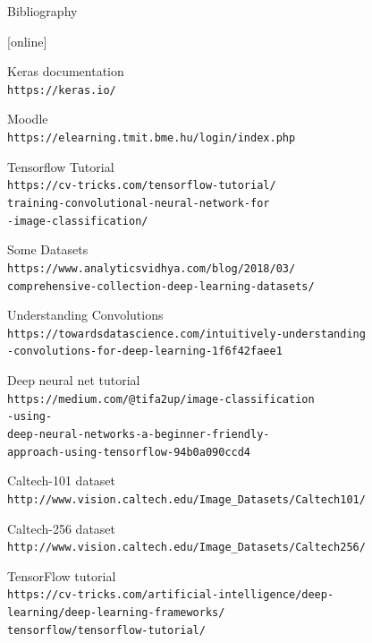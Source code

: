\documentclass{beamer}
\begin{document}
\begin{frame}[allowframebreaks]{Bibliography}
\footnotesize

  \begin{thebibliography}{8}
  [online]

   Keras documentation
   \\\texttt{https://keras.io/}

   Moodle
   \\\texttt{https://elearning.tmit.bme.hu/login/index.php}

   Tensorflow Tutorial
   \\\texttt{https://cv-tricks.com/tensorflow-tutorial/\\training-convolutional-neural-network-for\\-image-classification/}

   Some Datasets
   \\\texttt{https://www.analyticsvidhya.com/blog/2018/03/\\comprehensive-collection-deep-learning-datasets/}


   Understanding Convolutions
   \\\texttt{https://towardsdatascience.com/intuitively-understanding\\-convolutions-for-deep-learning-1f6f42faee1}

   Deep neural net tutorial
   \\\texttt{https://medium.com/@tifa2up/image-classification\\-using-\\deep-neural-networks-a-beginner-friendly-\\approach-using-tensorflow-94b0a090ccd4}

   Caltech-101 dataset
   \\\texttt{http://www.vision.caltech.edu/Image\_Datasets/Caltech101/}


   Caltech-256 dataset
   \\\texttt{http://www.vision.caltech.edu/Image\_Datasets/Caltech256/}


   TensorFlow tutorial
   \\\texttt{https://cv-tricks.com/artificial-intelligence/deep-\\learning/deep-learning-frameworks/\\tensorflow/tensorflow-tutorial/}


\end{thebibliography}
\end{frame}
\end{document}
